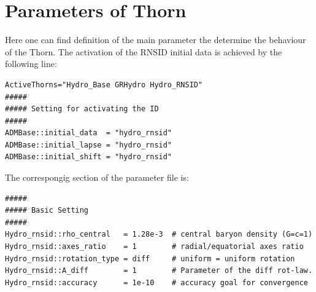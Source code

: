 \documentclass{article}
\begin{document}
\section{Parameters of Thorn}
\label{sec:rnsid_par}

Here one can find definition of the main parameter the determine the
behaviour of the Thorn. The activation of the RNSID initial data
is achieved by the following line:
\begin{verbatim}
ActiveThorns="Hydro_Base GRHydro Hydro_RNSID"
#####
##### Setting for activating the ID 
#####
ADMBase::initial_data  = "hydro_rnsid"
ADMBase::initial_lapse = "hydro_rnsid"
ADMBase::initial_shift = "hydro_rnsid"
\end{verbatim}

The correspongig section of the parameter file is:
\begin{verbatim}
#####
##### Basic Setting
#####
Hydro_rnsid::rho_central   = 1.28e-3  # central baryon density (G=c=1) 
Hydro_rnsid::axes_ratio    = 1        # radial/equatorial axes ratio 
Hydro_rnsid::rotation_type = diff     # uniform = uniform rotation
Hydro_rnsid::A_diff        = 1        # Parameter of the diff rot-law.
Hydro_rnsid::accuracy      = 1e-10    # accuracy goal for convergence
\end{verbatim}
\end{document}
